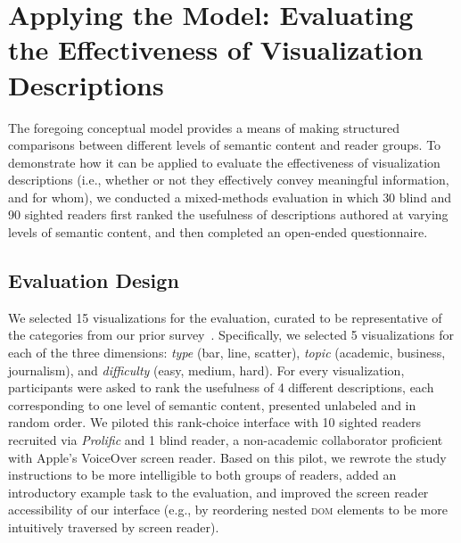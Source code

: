 \section{Applying the Model: Evaluating the Effectiveness of Visualization Descriptions}
\label{section:5}

The foregoing conceptual model provides a means of making structured comparisons between different levels of semantic content and reader groups.
To demonstrate how it can be applied to evaluate the effectiveness of visualization descriptions (i.e., whether or not they effectively convey meaningful information, and for whom), we conducted a mixed-methods evaluation in which {30} blind and {90} sighted readers first ranked the usefulness of descriptions authored at varying levels of semantic content, and then completed an open-ended questionnaire.

\subsection{Evaluation Design}
\label{section:study2design}

We selected 15 visualizations for the evaluation, curated to be representative of the categories from our prior survey~.
Specifically, we selected 5 visualizations for each of the three dimensions: \emph{type} (bar, line, scatter), \emph{topic} (academic, business, journalism), and \emph{difficulty} (easy, medium, hard).
For every visualization, participants were asked to rank the usefulness of 4 different descriptions, each corresponding to one level of semantic content, presented unlabeled and in random order.
We piloted this rank-choice interface with 10 sighted readers recruited via \emph{Prolific} and 1 blind reader, a non-academic collaborator proficient with Apple's VoiceOver screen reader. 
Based on this pilot, we rewrote the study instructions to be more intelligible to both groups of readers, added an introductory example task to the evaluation, and improved the screen reader accessibility of our interface (e.g., by reordering nested \textsc{dom} elements to be more intuitively traversed by screen reader).

